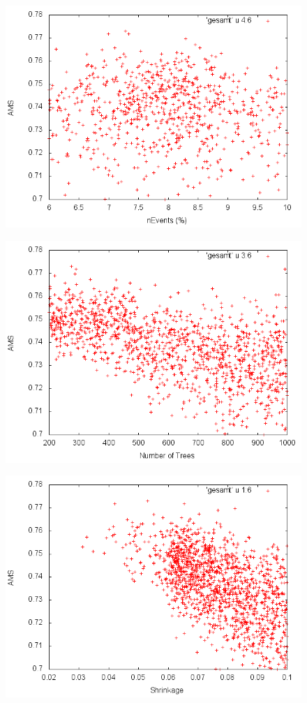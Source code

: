 \begin{figure}[htp]
\begin{center}
  \includegraphics[width=0.7\linewidth]{sections/parameter_optimization_bdt/nEvents.png}
 \caption[]{}
\label{fig:bdt_nEvents}
\end{center}
\end{figure}

\begin{figure}[htp]
\begin{center}
  \includegraphics[width=0.7\linewidth]{sections/parameter_optimization_bdt/Nt.png}
 \caption[]{}
\label{fig:bdt_Nt}
\end{center}
\end{figure}

\begin{figure}[htp]
\begin{center}
  \includegraphics[width=0.7\linewidth]{sections/parameter_optimization_bdt/Shrinkage.png}
 \caption[]{}
\label{fig:bdt_Shrinkage}
\end{center}
\end{figure}